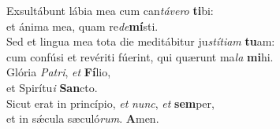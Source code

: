 \evenverse Exsultábunt lábia mea cum can\textit{tá}\textit{ve}\textit{ro} \textbf{ti}bi:~\*\\
\evenverse et ánima mea, quam re\textit{de}\textbf{mí}sti.\\
\oddverse Sed et lingua mea tota die meditábitur ju\textit{stí}\textit{ti}\textit{am} \textbf{tu}am:~\*\\
\oddverse cum confúsi et revériti fúerint, qui quærunt ma\textit{la} \textbf{mi}hi.\\
\evenverse Glória \textit{Pa}\textit{tri}, \textit{et} \textbf{Fí}lio,~\*\\
\evenverse et Spirítu\textit{i} \textbf{San}cto.\\
\oddverse Sicut erat in princípio, \textit{et} \textit{nunc}, \textit{et} \textbf{sem}per,~\*\\
\oddverse et in sǽcula sæculó\textit{rum}. \textbf{A}men.\\
